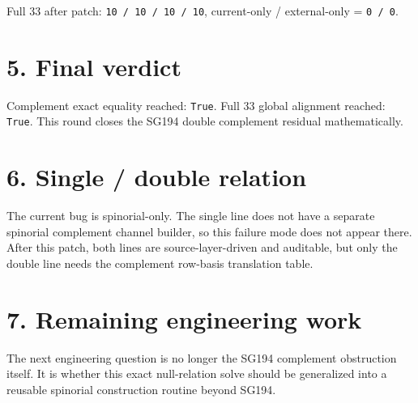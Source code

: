 \documentclass[11pt]{article}
\begin{document}
Full 33 after patch: \texttt{10 / 10 / 10 / 10}, current-only / external-only = \texttt{0 / 0}.

\section*{5. Final verdict}
Complement exact equality reached: \texttt{True}. Full 33 global alignment reached: \texttt{True}. This round closes the SG194 double complement residual mathematically.

\section*{6. Single / double relation}
The current bug is spinorial-only. The single line does not have a separate spinorial complement channel builder, so this failure mode does not appear there. After this patch, both lines are source-layer-driven and auditable, but only the double line needs the complement row-basis translation table.

\section*{7. Remaining engineering work}
The next engineering question is no longer the SG194 complement obstruction itself. It is whether this exact null-relation solve should be generalized into a reusable spinorial construction routine beyond SG194.
\end{document}
